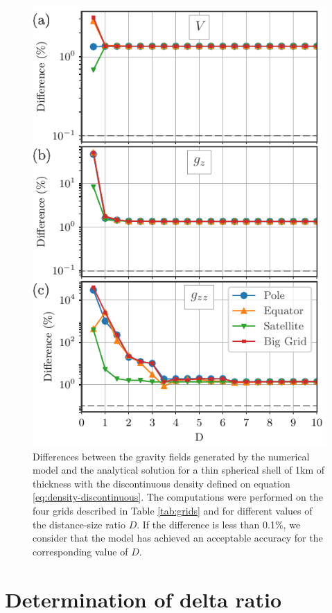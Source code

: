 \documentclass[extra]{gji}
\begin{document}
\begin{figure}
\centering
\includegraphics[width=0.9\linewidth]{figures/discontinuous-D-asym.pdf}
\caption{
    Differences between the gravity fields generated by the numerical model and the analytical solution for a thin spherical shell of 1km of thickness with the discontinuous density defined on equation \ref{eq:density-discontinuous}. The computations were performed on the four grids described in Table \ref{tab:grids} and for different values of the distance-size ratio $D$. If the difference is less than 0.1\%, we consider that the model has achieved an acceptable accuracy for the corresponding value of $D$.
}
\label{fig:D-discont-asym}
\end{figure}



\section{Determination of delta ratio}
\end{document}
